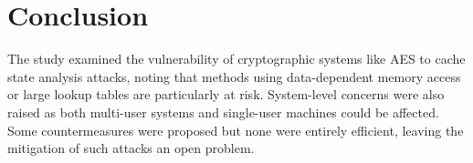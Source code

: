 \section{Conclusion}
The study examined the vulnerability of cryptographic systems like AES to cache state analysis attacks, noting that methods using data-dependent memory access or large lookup tables are particularly at risk. System-level concerns were also raised as both multi-user systems and single-user machines could be affected. Some countermeasures were proposed but none were entirely efficient, leaving the mitigation of such attacks an open problem.
